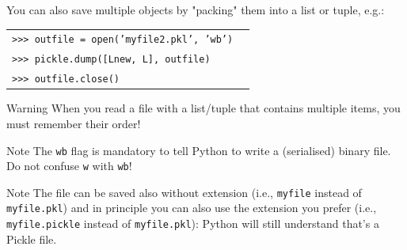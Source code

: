 \documentclass[t,handout,9pt]{beamer}
\begin{document}
%
\begin{frame}
\vfill
You can also save multiple objects by "packing" them into a list or tuple, e.g.:
\begin{table}[]
\begin{flushleft}
\begin{tabular}{ll}
\texttt{>{}>{}> outfile = open('myfile2.pkl', 'wb')} & \\
\texttt{>{}>{}> pickle.dump([Lnew, L], outfile)} & \\
\texttt{>{}>{}> outfile.close()} &  \\
\end{tabular}
\end{flushleft}
\end{table}
\begin{block}{Warning}
When you read a file with a list/tuple that contains multiple items, you must remember their order!
\end{block}
\begin{block}{Note}
The \texttt{wb} flag is mandatory to tell Python to write a (serialised) binary file. Do not confuse \texttt{w} with \texttt{wb}!
\end{block}
\begin{block}{Note}
The file can be saved also without extension (i.e., \texttt{myfile} instead of \texttt{myfile.pkl}) and in principle you can also use the extension you prefer (i.e., \texttt{myfile.pickle} instead of \texttt{myfile.pkl}): Python will still understand that's a Pickle file.
\end{block}
\vfill
\end{frame}
%
\end{document}
